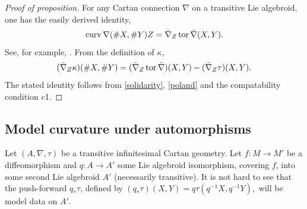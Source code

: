\documentclass[leqno,12pt]{amsart} %
\begin{document}
\begin{proof}[Proof of proposition]
  For any Cartan connection $\nabla $ on a transitive Lie algebroid, one has the easily
  derived identity,
  \begin{equation}
    \label{solidarity}
    \operatorname{curv}\nabla(\#X, \#Y)Z =  \bar\nabla_Z\operatorname{tor} \bar\nabla (X, Y).
  \end{equation}
  See, for example, \cite[\S5.4]{Blaom_06}. From the definition of $\kappa $,
  \begin{equation}
    \label{poland}
    (\bar\nabla_Z\kappa)(\#X, \#Y) = (\bar\nabla_Z\operatorname{tor} \bar\nabla)(X, Y) -
    (\bar\nabla_Z \tau)(X, Y).
  \end{equation}
  The stated identity follows from \eqref{solidarity}, \eqref{poland} and the
  compatability condition c1.
\end{proof}

\subsection{Model curvature under automorphisms}\label{transform}
Let $(A, \nabla, \tau)$ be a transitive infinitesimal Cartan geometry. Let
$f \colon M \rightarrow M'$ be a diffeomorphism and $q \colon A \rightarrow A'$ some Lie
algebroid isomorphism, covering $f$, into some second Lie algebroid $A'$ (necessarily
transitive). It is not hard to see that the push-forward $q_*\tau$, defined by
$(q_*\tau)(X, Y) = q \tau(q^{-1}X, q^{-1}Y),$ will be model data on $A'$.
\end{document}
